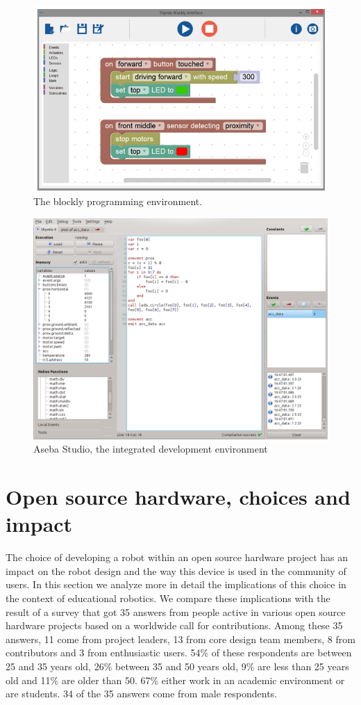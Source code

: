 \documentclass[letterpaper, 10 pt, conference]{ieeeconf}  %
\begin{document}
\begin{figure}
\centering
\includegraphics[width=.9\columnwidth]{figures/blockly}
\caption{The blockly programming environment.}
\label{fig:blockly}
\end{figure}

\begin{figure}
\centering
\includegraphics[width=.9\columnwidth]{figures/aseba-studio}
\caption{Aseba Studio, the integrated development environment}
\label{fig:aseba-studio}
\end{figure}

\section{Open source hardware, choices and impact}

The choice of developing a robot within an open source hardware project has an impact on the robot design and the way this device is used in the community of users. 
In this section we analyze more in detail the implications of this choice in the context of educational robotics.
We compare these implications with the result of a survey that got 35 answers from people active in various open source hardware projects based on a worldwide call for contributions. 
Among these 35 answers, 11 come from project leaders, 13 from core design team members, 8 from contributors and 3 from enthusiastic users.
54\% of these respondents are between 25 and 35 years old, 26\% between 35 and 50 years old, 9\% are less than 25 years old and 11\% are older than 50.  
67\% either work in an academic environment or are students. 
34 of the 35 answers come from male respondents.
\end{document}
